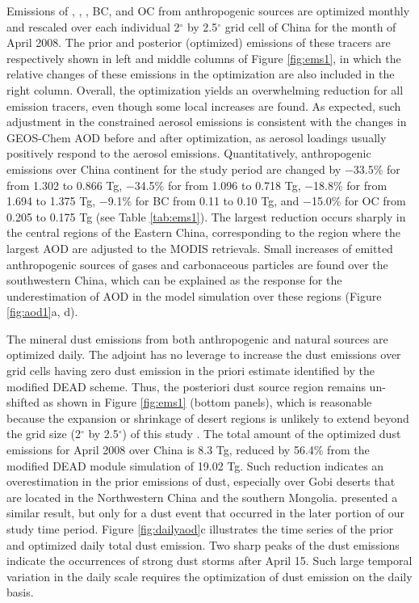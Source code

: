  Emissions of , , , BC, and OC from anthropogenic sources
 are optimized monthly and rescaled over each individual
 2$^{\circ}$ by 2.5$^{\circ}$ grid cell of China for the month of April 2008.
 The prior and posterior (optimized) emissions of these tracers
 are respectively shown in left and middle columns of Figure \ref{fig:ems1},
 in which the relative changes of these emissions in the optimization
 are also included in the right column. Overall, the optimization yields
 an overwhelming reduction for all emission tracers,
 even though some local increases are found.
 As expected, such adjustment in the constrained aerosol emissions
 is consistent with the changes in GEOS-Chem AOD before and after optimization,
 as aerosol loadings usually positively respond to the aerosol emissions.
 Quantitatively, anthropogenic emissions over China continent for the study period
 are changed by $-$33.5\% for  from 1.302 to 0.866 Tg, $-$34.5\% for  from 1.096 to 0.718 Tg,
 $-$18.8\% for  from 1.694 to 1.375 Tg, $-$9.1\% for BC from 0.11 to 0.10 Tg,
 and $-$15.0\% for OC from 0.205 to 0.175 Tg (see Table \ref{tab:ems1}).
 The largest reduction occurs sharply in the central regions of the Eastern China,
 corresponding to the region where the largest AOD are adjusted to the MODIS retrievals.
 Small increases of emitted anthropogenic sources of gases and carbonaceous particles
 are found over the southwestern China, which can be explained
 as the response for the underestimation of AOD in the model simulation over these regions
 (Figure \ref{fig:aod1}a, d). 

 The mineral dust emissions from both anthropogenic and natural sources are optimized daily.
 The adjoint has no leverage to increase the dust emissions over grid cells
 having zero dust emission in the priori estimate identified by the modified DEAD scheme.
 Thus, the posteriori dust source region remains un-shifted as shown
 in Figure \ref{fig:ems1} (bottom panels), which is reasonable
 because the expansion or shrinkage of desert regions is unlikely to extend beyond
 the grid size (2$^{\circ}$ by 2.5$^{\circ}$) of this study \citep{zender03a,fairlie07}.
 The total amount of the optimized dust emissions for April 2008 over China is 8.3 Tg,
 reduced by 56.4\% from the modified DEAD module simulation of 19.02 Tg.
 Such reduction indicates an overestimation in the prior emissions of dust,
 especially over Gobi deserts that are located in the Northwestern China and the southern Mongolia.
 \citet{wang12} presented a similar result,
 but only for a dust event that occurred in the later portion of our study time period.
 Figure \ref{fig:dailyaod}c illustrates the time series of the prior and optimized
 daily total dust emission.
 Two sharp peaks of the dust emissions indicate the occurrences of strong dust storms
 after April 15. Such large temporal variation in the daily scale
 requires the optimization of dust emission on the daily basis. 

